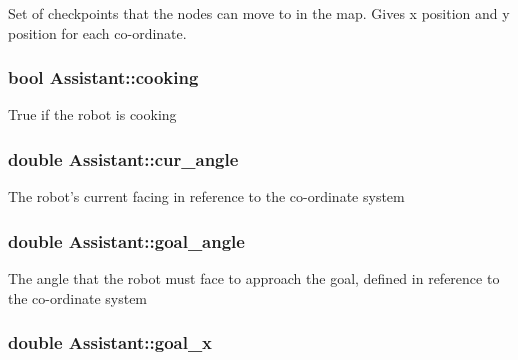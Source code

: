 Set of checkpoints that the nodes can move to in the map. Gives x position and y position for each co-\/ordinate. 

\hypertarget{classAssistant_af9a992d4b1c5036ed73c57c7e1c5c258}{
\subsubsection[{cooking}]{\setlength{\rightskip}{0pt plus 5cm}bool Assistant\-::cooking\hspace{0.3cm}{\ttfamily [protected]}}}\label{classAssistant_af9a992d4b1c5036ed73c57c7e1c5c258}
True if the robot is cooking \hypertarget{classAssistant_a451a20f551c43d0b6810c8208fe84773}{
\subsubsection[{cur\-\_\-angle}]{\setlength{\rightskip}{0pt plus 5cm}double Assistant\-::cur\-\_\-angle\hspace{0.3cm}{\ttfamily [protected]}}}\label{classAssistant_a451a20f551c43d0b6810c8208fe84773}
The robot's current facing in reference to the co-\/ordinate system \hypertarget{classAssistant_ae4468e02db193f0ffa0ca17a249f802d}{
\subsubsection[{goal\-\_\-angle}]{\setlength{\rightskip}{0pt plus 5cm}double Assistant\-::goal\-\_\-angle\hspace{0.3cm}{\ttfamily [protected]}}}\label{classAssistant_ae4468e02db193f0ffa0ca17a249f802d}
The angle that the robot must face to approach the goal, defined in reference to the co-\/ordinate system \hypertarget{classAssistant_a1a1f1fe48d0eb6a6a39b7fbdb2ef6641}{
\subsubsection[{goal\-\_\-x}]{\setlength{\rightskip}{0pt plus 5cm}double Assistant\-::goal\-\_\-x\hspace{0.3cm}{\ttfamily [protected]}}}\label{classAssistant_a1a1f1fe48d0eb6a6a39b7fbdb2ef6641}
